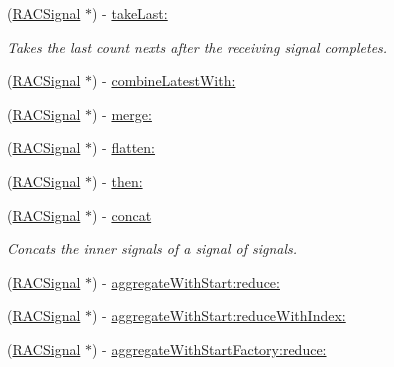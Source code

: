 \begin{DoxyCompactItemize}
(\mbox{\hyperlink{interface_r_a_c_signal}{R\+A\+C\+Signal}} $\ast$) -\/ \mbox{\hyperlink{category_r_a_c_signal_07_operations_08_a0f359e9261777b7999c7229c105211ee}{take\+Last\+:}}
\begin{DoxyCompactList}\small\item\em Takes the last {\ttfamily count} {\ttfamily next}s after the receiving signal completes. \end{DoxyCompactList}\item 
(\mbox{\hyperlink{interface_r_a_c_signal}{R\+A\+C\+Signal}} $\ast$) -\/ \mbox{\hyperlink{category_r_a_c_signal_07_operations_08_afab1b19558df566351cf87e466a5022f}{combine\+Latest\+With\+:}}
\item 
(\mbox{\hyperlink{interface_r_a_c_signal}{R\+A\+C\+Signal}} $\ast$) -\/ \mbox{\hyperlink{category_r_a_c_signal_07_operations_08_aeda66daaf146a2d218ba7819297628a9}{merge\+:}}
\item 
(\mbox{\hyperlink{interface_r_a_c_signal}{R\+A\+C\+Signal}} $\ast$) -\/ \mbox{\hyperlink{category_r_a_c_signal_07_operations_08_a72e5f2fd80960ee5422e08ceef0f4e2c}{flatten\+:}}
\item 
(\mbox{\hyperlink{interface_r_a_c_signal}{R\+A\+C\+Signal}} $\ast$) -\/ \mbox{\hyperlink{category_r_a_c_signal_07_operations_08_aeed35de5a36e70f87721a0ad6ffabecd}{then\+:}}
\item 
\mbox{\label{category_r_a_c_signal_07_operations_08_a68bff1ad76f3dddda45dcf3dc98a1ae2}} 
(\mbox{\hyperlink{interface_r_a_c_signal}{R\+A\+C\+Signal}} $\ast$) -\/ \mbox{\hyperlink{category_r_a_c_signal_07_operations_08_a68bff1ad76f3dddda45dcf3dc98a1ae2}{concat}}
\begin{DoxyCompactList}\small\item\em Concats the inner signals of a signal of signals. \end{DoxyCompactList}\item 
(\mbox{\hyperlink{interface_r_a_c_signal}{R\+A\+C\+Signal}} $\ast$) -\/ \mbox{\hyperlink{category_r_a_c_signal_07_operations_08_a4b872b6c2322aa37f98282043e768582}{aggregate\+With\+Start\+:reduce\+:}}
\item 
(\mbox{\hyperlink{interface_r_a_c_signal}{R\+A\+C\+Signal}} $\ast$) -\/ \mbox{\hyperlink{category_r_a_c_signal_07_operations_08_a83c6fc367091505aa6721f1c6a58d65d}{aggregate\+With\+Start\+:reduce\+With\+Index\+:}}
\item 
(\mbox{\hyperlink{interface_r_a_c_signal}{R\+A\+C\+Signal}} $\ast$) -\/ \mbox{\hyperlink{category_r_a_c_signal_07_operations_08_a51c08c7a357f83c96c468a6aa13d4d87}{aggregate\+With\+Start\+Factory\+:reduce\+:}}

\end{DoxyCompactItemize}
